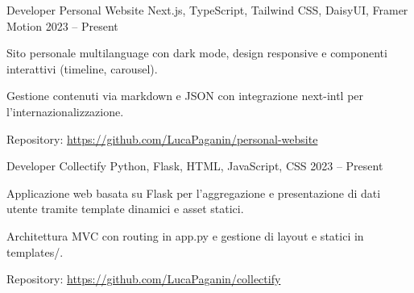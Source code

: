 \begin{cventries}

\cventry
{Developer} %
{Personal Website} %
{Next.js, TypeScript, Tailwind CSS, DaisyUI, Framer Motion} %
{2023 -- Present} %
{ %
\begin{cvitems}
  \item {Sito personale multilanguage con dark mode, design responsive e componenti interattivi (timeline, carousel).}
  \item {Gestione contenuti via markdown e JSON con integrazione next-intl per l'internazionalizzazione.}
  \item {Repository: \url{https://github.com/LucaPaganin/personal-website}}  
\end{cvitems}
}


\cventry
{Developer} %
{Collectify} %
{Python, Flask, HTML, JavaScript, CSS} %
{2023 -- Present} %
{ %
\begin{cvitems}
  \item {Applicazione web basata su Flask per l'aggregazione e presentazione di dati utente tramite template dinamici e asset statici.}
  \item {Architettura MVC con routing in app.py e gestione di layout e statici in templates/.}
  \item {Repository: \url{https://github.com/LucaPaganin/collectify}}  
\end{cvitems}
}

\end{cventries}